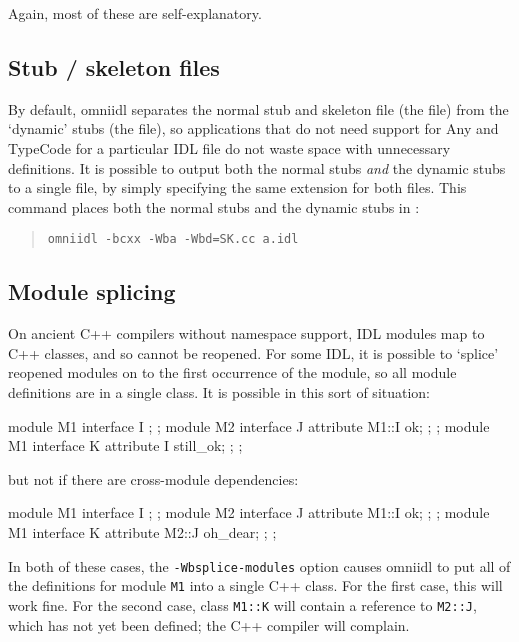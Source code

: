 \documentclass[11pt,twoside,a4paper]{book}
\newcommand{\type}[1]{\texttt{#1}}
\newcommand{\intf}[1]{\texttt{#1}}
\newcommand{\cmdline}[1]{\texttt{#1}}
\newcommand{\file}{\begingroup \urlstyle{tt}\Url}
\begin{document}
\noindent Again, most of these are self-explanatory.


\subsection{Stub / skeleton files}

By default, omniidl separates the normal stub and skeleton file (the
\file{SK.cc} file) from the `dynamic' stubs (the \file{DynSK.cc}
file), so applications that do not need support for Any and TypeCode
for a particular IDL file do not waste space with unnecessary
definitions. It is possible to output both the normal stubs \emph{and}
the dynamic stubs to a single file, by simply specifying the same
extension for both files. This command places both the normal stubs
and the dynamic stubs in \file{aSK.cc}:

\begin{quote}
\cmdline{omniidl -bcxx -Wba -Wbd=SK.cc a.idl}
\end{quote}



\subsection{Module splicing}

On ancient C++ compilers without namespace support, IDL modules map to
C++ classes, and so cannot be reopened. For some IDL, it is possible
to `splice' reopened modules on to the first occurrence of the module,
so all module definitions are in a single class. It is possible in
this sort of situation:

\begin{idllisting}
module M1 {
  interface I {};
};
module M2 {
  interface J {
    attribute M1::I ok;
  };
};
module M1 {
  interface K {
    attribute I still_ok;
  };
};
\end{idllisting}

\noindent but not if there are cross-module dependencies:

\begin{idllisting}
module M1 {
  interface I {};
};
module M2 {
  interface J {
    attribute M1::I ok;
  };
};
module M1 {
  interface K {
    attribute M2::J oh_dear;
  };
};
\end{idllisting}

\noindent In both of these cases, the \cmdline{-Wbsplice-modules}
option causes omniidl to put all of the definitions for module
\intf{M1} into a single C++ class. For the first case, this will work
fine. For the second case, class \type{M1::K} will contain a reference
to \type{M2::J}, which has not yet been defined; the C++ compiler will
complain.
\end{document}
